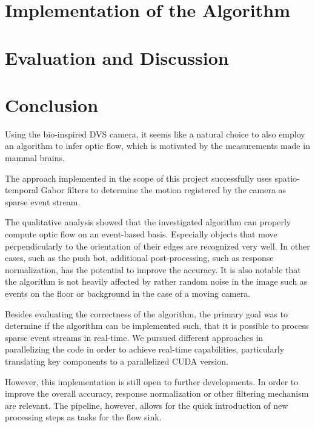 \documentclass[a4paper,twoside, openright,12pt]{report}
\begin{document}
\chapter{Implementation of the Algorithm} 	




\chapter{Evaluation and Discussion}





\chapter{Conclusion}


Using the bio-inspired DVS camera, it seems like a natural choice to also employ an algorithm to infer optic flow, which is motivated by the measurements made in mammal brains.

The approach implemented in the scope of this project successfully uses spatio-temporal Gabor filters to determine the motion registered by the camera as sparse event stream.

The qualitative analysis showed that the investigated algorithm can properly compute optic flow on an event-based basis.
Especially objects that move perpendicularly to the orientation of their edges are recognized very well.
In other cases, such as the push bot, additional post-processing, such as response normalization, has the potential to improve the accuracy.
It is also notable that the algorithm is not heavily affected by rather random noise in the image such as events on the floor or background in the case of a moving camera.

Besides evaluating the correctness of the algorithm, the primary goal was to determine if the algorithm can be implemented such, that it is possible to process sparse event streams in real-time.
We pursued different approaches in parallelizing the code in order to achieve real-time capabilities, particularly translating key components to a parallelized CUDA version.

However, this implementation is still open to further developments.
In order to improve the overall accuracy, response normalization or other filtering mechanism are relevant.
The pipeline, however, allows for the quick introduction of new processing steps as tasks for the flow sink.
\end{document}
